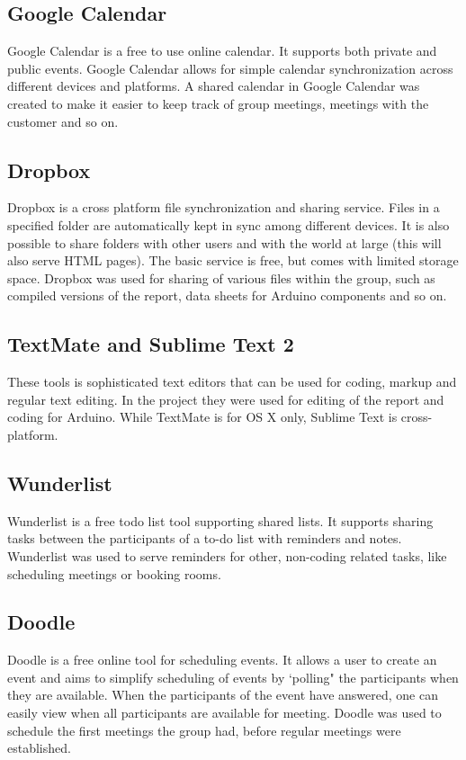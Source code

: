 \subsection{Google Calendar}
Google Calendar is a free to use online calendar. It supports both private and public events. Google Calendar allows for simple calendar synchronization across different devices and platforms. A shared calendar in Google Calendar was created to make it easier to keep track of group meetings, meetings with the customer and so on.

\subsection{Dropbox}
Dropbox is a cross platform file synchronization and sharing service. Files in a specified folder are automatically kept in sync among different devices. It is also possible to share folders with other users and with the world at large (this will also serve HTML pages). The basic service is free, but comes with limited storage space. Dropbox was used for sharing of various files within the group, such as compiled versions of the report, data sheets for Arduino components and so on.

\subsection{TextMate and Sublime Text 2}
These tools is sophisticated text editors that can be used for coding, markup and regular text editing. In the project they were used for editing of the report and coding for Arduino. While TextMate is for OS X only, Sublime Text is cross-platform.

\subsection{Wunderlist}
Wunderlist is a free todo list tool supporting shared lists. It supports sharing tasks between the participants of a to-do list with reminders and notes. Wunderlist was used to serve reminders for other, non-coding related tasks, like scheduling meetings or booking rooms.

\subsection{Doodle}
Doodle is a free online tool for scheduling events. It allows a user to create an event and aims to simplify scheduling of events by `polling" the participants when they are available. When the participants of the event have answered, one can easily view when all participants are available for meeting. Doodle was used to schedule the first meetings the group had, before regular meetings were established.


